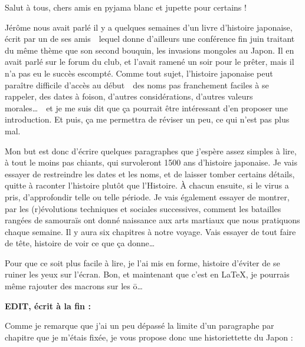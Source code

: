 Salut à tous, chers amis en pyjama blanc et jupette pour certains !

Jérôme nous avait parlé il y a quelques semaines d'un livre d'histoire
japonaise, écrit par un de ses amis~\incise~lequel donne d'ailleurs une
conférence fin juin traitant du même thème que son second bouquin, les
invasions mongoles au Japon. Il en avait parlé sur le forum du club, et
l'avait ramené un soir pour le prêter, mais il n'a pas eu le succès escompté.
Comme tout sujet, l'histoire japonaise peut paraître difficile d'accès au
début~\incise~des noms pas franchement faciles à se rappeler, des dates à
foison, d'autres considérations, d'autres valeurs morales\dots~\incise~et je
me suis dit que ça pourrait être intéressant d'en proposer une introduction.
Et puis, ça me permettra de réviser un peu, ce qui n'est pas plus mal.

Mon but est donc d'écrire quelques paragraphes que j'espère assez simples à
lire, à tout le moins pas chiants, qui survoleront 1500 ans d'histoire
japonaise. Je vais essayer de restreindre les dates et les noms, et de laisser
tomber certains détails, quitte à raconter l'histoire plutôt que l'Histoire. À
chacun ensuite, si le virus a pris, d'approfondir telle ou telle période. Je
vais également essayer de montrer, par les (r)évolutions techniques et
sociales successives, comment les batailles rangées de samouraïs ont donné
naissance aux arts martiaux que nous pratiquons chaque semaine. Il y aura six
chapitres à notre voyage. Vais essayer de tout faire de tête, histoire de voir
ce que ça donne\dots

Pour que ce soit plus facile à lire, je l'ai mis en forme, histoire d'éviter
de se ruiner les yeux sur l'écran. Bon, et maintenant que c'est en \LaTeX{},
je pourrais même rajouter des macrons sur les \={o}\dots

\textbf{EDIT, écrit à la fin :}

Comme je remarque que j'ai un peu dépassé la limite d'un paragraphe par
chapitre que je m'étais fixée, je vous propose donc une historiettette du
Japon :


